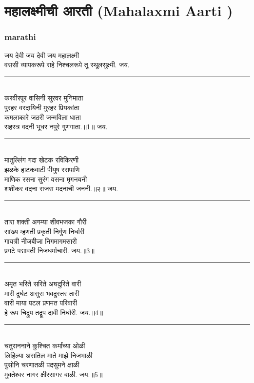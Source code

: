 \documentclass[letterpaper,twocolumn,openany,nodeprecatedcode]{dndbook}
\begin{document}
\chapter{महालक्ष्मीची आरती (Mahalaxmi Aarti )}
\begin{flushleft}
  \subsection*{marathi}
  जय देवी जय देवी जय महालक्ष्मी \\
  वससी व्यापकरूपे राहे निश्चलरूपे तू स्थूलसुक्ष्मी. जय. \\
  \rule{\linewidth}{1pt} \\
  करवीरपूर वासिनी सुरवर मुनिमाता \\
  पुरहर वरदायिनी मुरहर प्रियकांता \\
  कमलाकारे जठरी जन्मविला धाता \\
  सहस्त्र वदनी भूधर नपुरे गुणगाता.॥1॥ जय. \\
  \rule{\linewidth}{1pt} \\
  मातुल्लिंग गदा खेटक रविकिरणी \\
  झळके हाटकवाटी पीयुष रसपाणि \\
  माणिक रसना सुरंग वसना मृगनयनी \\
  शशीकर वदना राजस मदनाची जननी.॥२॥ जय. \\
  \rule{\linewidth}{1pt} \\
  तारा शक्ती अगम्या शीवभजका गौरी \\
  सांख्य म्हणती प्रकृती निर्गुण निर्धारी \\
  गायत्री नीजबीजा निगमागमसारी \\
  प्रगटे पद्मावती निजधर्माचारी. जय.॥3॥ \\
  \rule{\linewidth}{1pt} \\
  अमृत भरिते सरिते अघदुरिते वारी \\
  मारी दुर्घट असुरा भवदुस्तर तारी \\
  वारी माया पटल प्रणमत परिवारी \\
  हे रूप चिद्रुप तद्रूप दावी निर्धारी. जय.॥4॥ \\
  \rule{\linewidth}{1pt} \\
  चतुराननाने कुश्चित कर्मांच्या ओळी \\
  लिहिल्या असतिल माते माझे निजभाळी \\
  पुसोनि चरणातळी पदसुमने क्षाळी \\
  मुक्तेश्वर नागर क्षीरसागर बाळी. जय.॥5॥ \\
  \pagebreak

\end{flushleft}
\end{document}
